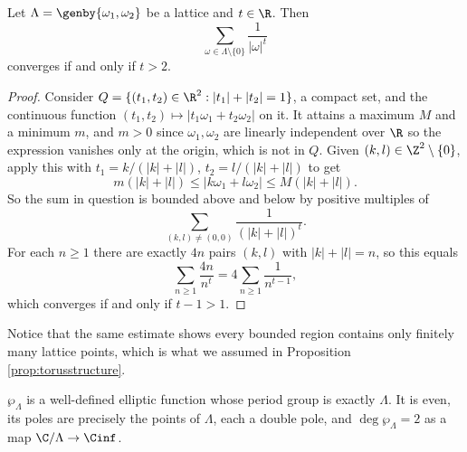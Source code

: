 \begin{lemma}\label{lem:latticesum}
	Let $\Lambda = \genby{\omega_1,\omega_2}$ be a lattice and $t \in \R$. Then
	$$
	\sum_{\omega\in\Lambda\setminus\{0\}}\frac{1}{|\omega|^t}
	$$
	converges if and only if $t > 2$.
\end{lemma}

\begin{proof}
	Consider $Q = \{(t_1,t_2)\in\R^2 : |t_1| + |t_2| = 1\}$, a compact set, and the
	continuous function $(t_1,t_2)\mapsto |t_1\omega_1 + t_2\omega_2|$ on it. It attains a
	maximum $M$ and a minimum $m$, and $m > 0$ since $\omega_1, \omega_2$ are linearly
	independent over $\R$ so the expression vanishes only at the origin, which is not in
	$Q$. Given $(k,l) \in \Z^2\setminus\{0\}$, apply this with
	$t_1 = k/(|k|+|l|)$, $t_2 = l/(|k|+|l|)$ to get
	$$
	m(|k|+|l|) \leq |k\omega_1 + l\omega_2| \leq M(|k|+|l|).
	$$
	So the sum in question is bounded above and below by positive multiples of
	$$
	\sum_{(k,l)\neq(0,0)}\frac{1}{(|k|+|l|)^t}.
	$$
	For each $n \geq 1$ there are exactly $4n$ pairs $(k,l)$ with $|k|+|l| = n$, so this
	equals
	$$
	\sum_{n\geq 1}\frac{4n}{n^t} = 4\sum_{n\geq1}\frac{1}{n^{t-1}},
	$$
	which converges if and only if $t - 1 > 1$.
\end{proof}

Notice that the same estimate shows every bounded region contains only finitely many
lattice points, which is what we assumed in Proposition \ref{prop:torusstructure}.

\begin{theorem}\label{thm:wp}
	$\wp_\Lambda$ is a well-defined elliptic function whose period group is exactly
	$\Lambda$. It is even, its poles are precisely the points of $\Lambda$, each a double
	pole, and $\deg\wp_\Lambda = 2$ as a map $\C/\Lambda\to\Cinf$.
\end{theorem}

